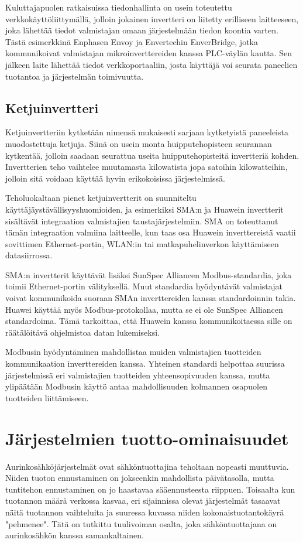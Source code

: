   Kuluttajapuolen ratkaisuissa tiedonhallinta on usein toteutettu verkkokäyttöliittymällä, jolloin jokainen invertteri on liitetty erilliseen laitteeseen, joka lähettää tiedot valmistajan omaan järjestelmään tiedon koontia varten. Tästä esimerkkinä Enphasen Envoy ja Envertechin EnverBridge, jotka kommunikoivat valmistajan mikroinverttereiden kanssa PLC-väylän kautta. Sen jälkeen laite lähettää tiedot verkkoportaaliin, josta käyttäjä voi seurata paneelien tuotantoa ja järjestelmän toimivuutta. \parencite{Enphase, Envertech}

\subsection{Ketjuinvertteri}
  Ketjuinvertteriin kytketään nimensä mukaisesti sarjaan kytketyistä paneeleista muodostettuja ketjuja. Siinä on usein monta huipputehopisteen seurannan kytkentää, jolloin saadaan seurattua useita huipputehopisteitä invertteriä kohden. Invertterien teho vaihtelee muutamasta kilowatista jopa satoihin kilowatteihin, jolloin sitä voidaan käyttää hyvin erikokoisissa järjestelmissä.

  Teholuokaltaan pienet ketjuinvertterit on suunniteltu käyttäjäystävällisyyshuomioiden, ja esimerkiksi SMA:n ja Huawein invertterit sisältävät integraation valmistajien taustajärjestelmiin. SMA on toteuttanut tämän integraation valmiina laitteelle, kun taas osa Huawein inverttereistä vaatii sovittimen Ethernet-portin, WLAN:in tai matkapuhelinverkon käyttämiseen datasiirrossa.

  SMA:n invertterit käyttävät lisäksi SunSpec Alliancen Modbus-standardia, joka toimii Ethernet-portin välityksellä. Muut standardia hyödyntävät valmistajat voivat kommunikoida suoraan SMAn inverttereiden kanssa standardoinnin takia. Huawei käyttää myös Modbus-protokollaa, mutta se ei ole SunSpec Alliancen standardoima. Tämä tarkoittaa, että Huawein kanssa kommunikoitaessa sille on räätälöitävä ohjelmistoa datan lukemiseksi. \parencite{SMAManual, Huawei}

  Modbusin hyödyntäminen mahdollistaa muiden valmistajien tuotteiden kommunikaation inverttereiden kanssa. Yhteinen standardi helpottaa suurissa järjestelmissä eri valmistajien tuotteiden yhteensopivuuden kanssa, mutta ylipäätään Modbusin käyttö antaa mahdollisuuden kolmannen osapuolen tuotteiden liittämiseen.

\section{Järjestelmien tuotto-ominaisuudet}
  Aurinkosähköjärjestelmät ovat sähköntuottajina teholtaan nopeasti muuttuvia. Niiden tuoton ennustaminen on jokseenkin mahdollista päivätasolla, mutta tuntitehon ennustaminen on jo haastavaa sääennusteesta riippuen. Toisaalta kun tuotannon määrä verkossa kasvaa, eri sijainnissa olevat järjestelmät tasaavat näitä tuotannon vaihteluita ja suuressa kuvassa niiden kokonaistuotantokäyrä "pehmenee". Tätä on tutkittu tuulivoiman osalta, joka sähköntuottajana on aurinkosähkön kanssa samankaltainen. \parencite{FluctuationIssues}
  
